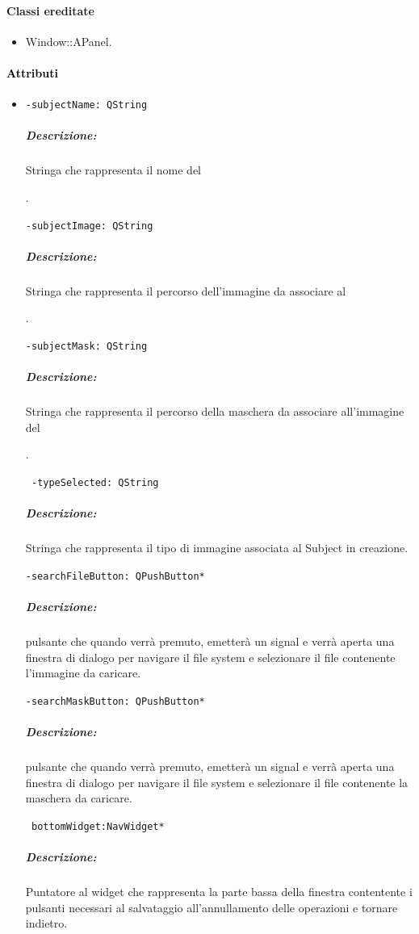\paragraph{Classi ereditate\\}
\begin{itemize}
\item Window::APanel.
\end{itemize}
\paragraph{\textcolor{black}{Attributi\\}}
\begin{itemize}
\item \color{teal}\verb!-subjectName: QString!
\color{black}
\subparagraph{Descrizione: }Stringa che rappresenta il nome del \subject{}.

\color{teal}\verb!-subjectImage: QString!
\color{black}
\subparagraph{Descrizione: }Stringa che rappresenta il percorso dell'immagine da associare al \subject{}.

\color{teal}\verb!-subjectMask: QString !
\color{black}
\subparagraph{Descrizione: }Stringa che rappresenta il percorso della maschera da associare all'immagine del \subject{}.

\color{teal}\verb! -typeSelected: QString!
\color{black} 
\subparagraph{Descrizione: }
Stringa che rappresenta il tipo di immagine associata al Subject\g{} in creazione.

\color{teal}\verb!-searchFileButton: QPushButton* !
\color{black}
\subparagraph{Descrizione: }pulsante che quando verrà premuto, emetterà un signal\g{} e verrà aperta una finestra di dialogo per navigare il file system e selezionare il file contenente l'immagine da caricare.

\color{teal}\verb!-searchMaskButton: QPushButton* !
\color{black}
\subparagraph{Descrizione: }pulsante che quando verrà premuto, emetterà un signal\g{} e verrà aperta una finestra di dialogo per navigare il file system e selezionare il file contenente la maschera da caricare.

\color{teal}\verb! bottomWidget:NavWidget*!
\color{black} 
\subparagraph{Descrizione: }
Puntatore al widget che rappresenta la parte bassa della finestra contentente i pulsanti necessari al salvataggio all'annullamento delle operazioni e tornare indietro.
\end{itemize}
